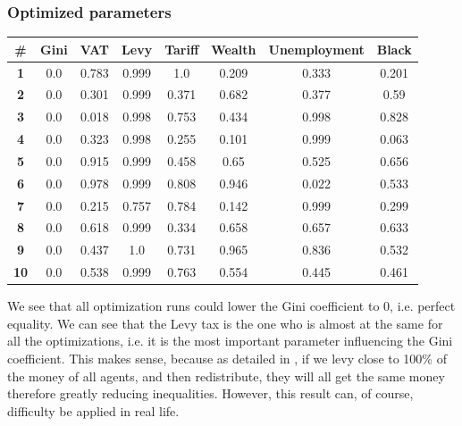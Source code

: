         \subsubsection{Optimized parameters}
        \begin{table}[H]
        \centering
        \begin{tabular}{|c|c|c|c|c|c|c|c|}
            \hline
            \textbf{\#} & \textbf{Gini}  & \textbf{VAT} & \textbf{Levy} & \textbf{Tariff} & \textbf{Wealth} & \textbf{Unemployment} & \textbf{Black} \\ \hline
            \textbf{1} & 0.0 & 0.783 & 0.999 & 1.0 & 0.209 & 0.333 & 0.201 \\ \hline
            \textbf{2} & 0.0 & 0.301 & 0.999 & 0.371 & 0.682 & 0.377 & 0.59 \\ \hline
            \textbf{3} & 0.0 & 0.018 & 0.998 & 0.753 & 0.434 & 0.998 & 0.828 \\ \hline
            \textbf{4} & 0.0 & 0.323 & 0.998 & 0.255 & 0.101 & 0.999 & 0.063 \\ \hline
            \textbf{5} & 0.0 & 0.915 & 0.999 & 0.458 & 0.65 & 0.525 & 0.656 \\ \hline
            \textbf{6} & 0.0 & 0.978 & 0.999 & 0.808 & 0.946 & 0.022 & 0.533 \\ \hline
            \textbf{7} & 0.0 & 0.215 & 0.757 & 0.784 & 0.142 & 0.999 & 0.299 \\ \hline
            \textbf{8} & 0.0 & 0.618 & 0.999 & 0.334 & 0.658 & 0.657 & 0.633 \\ \hline
            \textbf{9} & 0.0 & 0.437 & 1.0 & 0.731 & 0.965 & 0.836 & 0.532 \\ \hline
            \textbf{10} & 0.0 & 0.538 & 0.999 & 0.763 & 0.554 & 0.445 & 0.461 \\ \hline
        \end{tabular}
        \end{table}

        We see that all optimization runs could lower the Gini coefficient to 0, i.e. perfect equality. We can see that the Levy tax is the one who is almost at the same for all the optimizations, i.e. it is the most important parameter influencing the Gini coefficient.  This makes sense, because as detailed in , if we levy close to 100\% of the money of all agents, and then redistribute, they will all get the same money therefore greatly reducing inequalities. However, this result can, of course, difficulty be applied in real life. 
        
